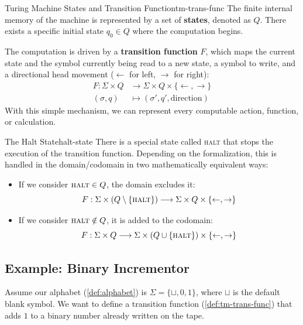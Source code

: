 \begin{definition}{Turing Machine States and Transition Function}{tm-trans-func}
    The finite internal memory of the machine is represented by a set of \textbf{states}, denoted as \(Q\). There exists a specific initial state \(q_0 \in Q\) where the computation begins. 

    The computation is driven by a \textbf{transition function} \(F\), which maps the current state and the symbol currently being read to a new state, a symbol to write, and a directional head movement (\(\leftarrow\) for left, \(\rightarrow\) for right):
    \[
    \begin{aligned}
        F: \Sigma \times Q &\longrightarrow \Sigma \times Q \times \{\leftarrow, \rightarrow\}\\
        (\sigma, q) &\longmapsto (\sigma', q', \text{direction})
    \end{aligned}
    \]
    With this simple mechanism, we can represent every computable action, function, or calculation.
\end{definition}

\begin{observation}{The Halt State}{halt-state}
    There is a special state called \textsc{halt} that stops the execution of the transition function. Depending on the formalization, this is handled in the domain/codomain in two mathematically equivalent ways:
    \begin{itemize}
        \item If we consider \(\textsc{halt} \in Q\), the domain excludes it:
        \[
            F: \Sigma \times \left(Q \setminus \{\textsc{halt}\}\right) \longrightarrow \Sigma \times Q \times \{\leftarrow, \rightarrow\}
        \]
        \item If we consider \(\textsc{halt} \notin Q\), it is added to the codomain:
        \[
            F: \Sigma \times Q \longrightarrow \Sigma \times \left(Q \cup \{\textsc{halt}\}\right) \times \{\leftarrow, \rightarrow\}
        \]
    \end{itemize}
\end{observation}

\subsection{Example: Binary Incrementor}
Assume our alphabet (\cref{def:alphabet}) is \(\Sigma = \{\sqcup, 0, 1\}\), where \(\sqcup\) is the default blank symbol. We want to define a transition function (\cref{def:tm-trans-func}) that adds \(1\) to a binary number already written on the tape. 

